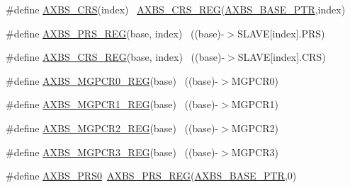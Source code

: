 \begin{DoxyCompactItemize}
\item 
\#define \hyperlink{group___a_x_b_s___register___accessor___macros_ga4a8510c9fc2b213af3b61317c78f3252}{A\+X\+B\+S\+\_\+\+C\+RS}(index)                                                ~\hyperlink{group___a_x_b_s___register___accessor___macros_ga77c6588049d7ae23bbfd8c643a5adbed}{A\+X\+B\+S\+\_\+\+C\+R\+S\+\_\+\+R\+EG}(\hyperlink{group___a_x_b_s___peripheral_gacbbf56489b86d1ddb3e0ac291922a56d}{A\+X\+B\+S\+\_\+\+B\+A\+S\+E\+\_\+\+P\+TR},index)
\item 
\#define \hyperlink{group___a_x_b_s___register___accessor___macros_gadfe35678a94e899b6b19386de08d3472}{A\+X\+B\+S\+\_\+\+P\+R\+S\+\_\+\+R\+EG}(base,  index)                              ~((base)-\/$>$S\+L\+A\+VE\mbox{[}index\mbox{]}.P\+RS)
\item 
\#define \hyperlink{group___a_x_b_s___register___accessor___macros_ga77c6588049d7ae23bbfd8c643a5adbed}{A\+X\+B\+S\+\_\+\+C\+R\+S\+\_\+\+R\+EG}(base,  index)                              ~((base)-\/$>$S\+L\+A\+VE\mbox{[}index\mbox{]}.C\+RS)
\item 
\#define \hyperlink{group___a_x_b_s___register___accessor___macros_ga73d5437b701295ca86a3c050a866cf37}{A\+X\+B\+S\+\_\+\+M\+G\+P\+C\+R0\+\_\+\+R\+EG}(base)                                    ~((base)-\/$>$M\+G\+P\+C\+R0)
\item 
\#define \hyperlink{group___a_x_b_s___register___accessor___macros_gacbc3fc10e92190984302e2c4426afdd9}{A\+X\+B\+S\+\_\+\+M\+G\+P\+C\+R1\+\_\+\+R\+EG}(base)                                    ~((base)-\/$>$M\+G\+P\+C\+R1)
\item 
\#define \hyperlink{group___a_x_b_s___register___accessor___macros_gab08d4773427a7ffad127e4fc1c6cc024}{A\+X\+B\+S\+\_\+\+M\+G\+P\+C\+R2\+\_\+\+R\+EG}(base)                                    ~((base)-\/$>$M\+G\+P\+C\+R2)
\item 
\#define \hyperlink{group___a_x_b_s___register___accessor___macros_gad34f5ebc24175e258b13abd4caa86ee4}{A\+X\+B\+S\+\_\+\+M\+G\+P\+C\+R3\+\_\+\+R\+EG}(base)                                    ~((base)-\/$>$M\+G\+P\+C\+R3)
\item 
\#define \hyperlink{group___a_x_b_s___register___accessor___macros_ga51c41c430b9e769dba2e453a898544ec}{A\+X\+B\+S\+\_\+\+P\+R\+S0}~\hyperlink{group___a_x_b_s___register___accessor___macros_gadfe35678a94e899b6b19386de08d3472}{A\+X\+B\+S\+\_\+\+P\+R\+S\+\_\+\+R\+EG}(\hyperlink{group___a_x_b_s___peripheral_gacbbf56489b86d1ddb3e0ac291922a56d}{A\+X\+B\+S\+\_\+\+B\+A\+S\+E\+\_\+\+P\+TR},0)
\item 

\end{DoxyCompactItemize}
